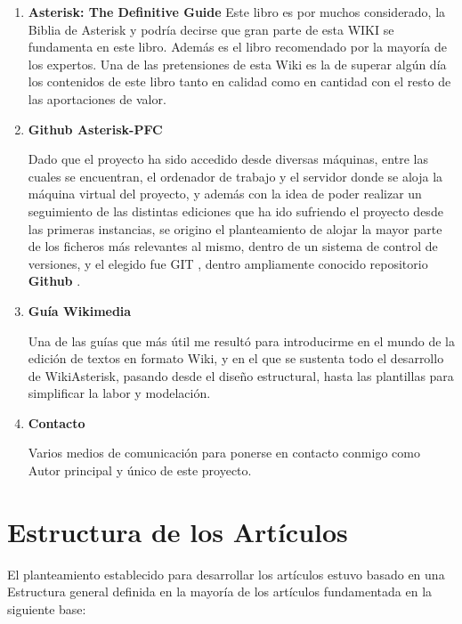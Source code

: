 \begin{enumerate}
	  \setlength{\itemsep}{10pt}

	\item \textbf{Asterisk: The Definitive Guide}
	Este libro es por muchos considerado, la Biblia de Asterisk y podría decirse que gran parte de esta WIKI se fundamenta en este libro. Además es el libro recomendado por la mayoría de los expertos. Una de las pretensiones de esta Wiki es la de superar algún día los contenidos de este libro tanto en calidad como en cantidad con el resto de las aportaciones de valor.
	
	\item \textbf{Github Asterisk-PFC}
	
	Dado que el proyecto ha sido accedido desde diversas máquinas, entre las cuales se encuentran, el ordenador de trabajo y el servidor donde se aloja la máquina virtual del proyecto, y además con la idea de poder realizar un seguimiento de las distintas ediciones que ha ido sufriendo el proyecto desde las primeras instancias, se origino el planteamiento de alojar la mayor parte de los ficheros más relevantes al mismo, dentro de un sistema de control de versiones, y el elegido fue GIT \cite{website:git}, dentro ampliamente conocido repositorio \textbf{Github} \cite{website:github}.
	
	\item \textbf{Guía Wikimedia}
	
	Una de las guías que más útil me resultó para introducirme en el mundo de la edición de textos en formato Wiki, y en el que se sustenta todo el desarrollo de WikiAsterisk, pasando desde el diseño estructural, hasta las plantillas para simplificar la labor y modelación.
	
	\item \textbf{Contacto}
	
	Varios medios de comunicación para ponerse en contacto conmigo como Autor principal y único de este proyecto.
	
\end{enumerate}


\section{Estructura de los Artículos}

El planteamiento establecido para desarrollar los artículos estuvo basado en una Estructura general definida en la mayoría de los artículos fundamentada en la siguiente base:

